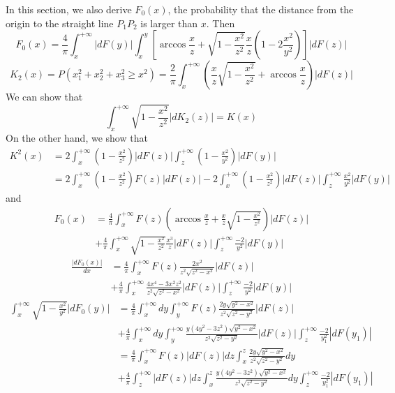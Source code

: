 \documentclass{article}
\begin{document}
In this section, we also derive $F_0(x)$,
the probability that
the distance from the origin to the straight line
$P_1P_2$
is larger than $x$.
Then
\begin{equation}
    F_0(x) =  \frac{4}{\pi}\int_x^{+\infty} |dF(y)|
    \int_x^{y} \left[\arccos \frac{x}{z}
    + \sqrt{1-\frac{x^2}{z^2}}\frac{x}{z}
    \left(1-2\frac{x^2}{y^2} \right) \right] |dF(z)|
\end{equation}
\begin{equation}
    K_2(x) = P(x_1^2+x_2^2+x_3^2 \geq x^2)
    = \frac{2}{\pi} \int_x^{+\infty}
    \left( \frac{x}{z}\sqrt{1-\frac{x^2}{z^2}} + \arccos\frac{x}{z}\right)|dF(z)|
\end{equation}
We can show that
\begin{equation}
    \int_x^{+\infty}\sqrt{1-\frac{x^2}{z^2}} |dK_2(z)|
    =  K(x)
\end{equation}
On the other hand, we show that
\begin{align*}
    K^2(x) & = 2\int_x^{+\infty} (1-\frac{x^2}{z^2})|dF(z)|
    \int_z^{+\infty} (1-\frac{x^2}{y^2}) |dF(y)|
    \\
    &= 2\int_x^{+\infty} (1-\frac{x^2}{z^2})F(z)|dF(z)|
    - 2 \int_x^{+\infty} (1-\frac{x^2}{z^2})|dF(z)|
    \int_z^{+\infty} \frac{x^2}{y^2} |dF(y)|
\end{align*}
and
\begin{align*}
    F_0(x) &= \frac{4}{\pi} \int_x^{+\infty}
    F(z)\left(\arccos \frac{x}{z}
    + \frac{x}{z}\sqrt{1-\frac{x^2}{z^2}}
    \right)|dF(z)|\\
    &+ \frac{4}{\pi}
    \int_x^{+\infty}
    \sqrt{1-\frac{x^2}{z^2}}
    \frac{x^3}{z} |dF(z)|
    \int_z^{+\infty} \frac{-2}{y^2} |dF(y)|
\end{align*}
\begin{align*}
    \frac{|dF_0(x)|}{dx} &= \frac{4}{\pi} \int_x^{+\infty}
    F(z)\frac{2x^2}{z^2 \sqrt{z^2-x^2}}|dF(z)|\\
    &+ \frac{4}{\pi}
    \int_x^{+\infty}
    \frac{4x^4-3x^2z^2}{z^2 \sqrt{z^2-x^2}} |dF(z)|
    \int_z^{+\infty} \frac{-2}{y^2} |dF(y)|
\end{align*}
\begin{align*}
    \int_x^{+\infty} \sqrt{1-\frac{x^2}{y^2}}
    |dF_0(y)| &= \frac{4}{\pi}
    \int_x^{+\infty}dy \int_y^{+\infty}
    F(z)\frac{2y\sqrt{y^2-x^2}}{z^2 \sqrt{z^2-y^2}}|dF(z)|\\
    &+ \frac{4}{\pi}\int_x^{+\infty}dy
    \int_y^{+\infty}
    \frac{y(4y^2-3z^2)\sqrt{y^2-x^2}}{z^2 \sqrt{z^2-y^2}} |dF(z)|
    \int_z^{+\infty} \frac{-2}{y_1^2} |dF(y_1)|\\
    &= \frac{4}{\pi}
    \int_x^{+\infty} F(z)|dF(z)|dz \int_x^{z}
    \frac{2y\sqrt{y^2-x^2}}{z^2 \sqrt{z^2-y^2}}dy\\
    &+ \frac{4}{\pi}\int_z^{+\infty}|dF(z)|dz
    \int_x^{z}
    \frac{y(4y^2-3z^2)\sqrt{y^2-x^2}}{z^2 \sqrt{z^2-y^2}} 
    dy\int_z^{+\infty} \frac{-2}{y_1^2} |dF(y_1)|
\end{align*}
\end{document}
